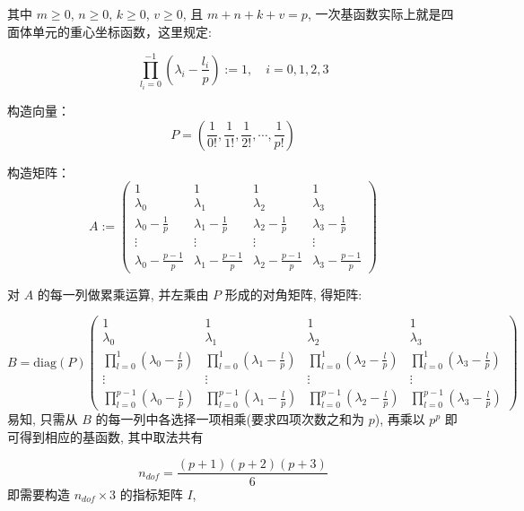 \documentclass[12pt,a4paper]{article}
\begin{document}
其中 $ m\geq 0$, $n\geq 0$, $ k \geq 0$, $v\geq 0$,  且 $m+n+k+v=p$, 一次基函数实际上就是四面体单元的重心坐标函数，这里规定:

$$
 \prod_{l_i=0}^{-1}(\lambda_i - \frac{l_i}{p}) := 1,\quad i=0, 1, 2, 3
$$

构造向量：
$$
P = ( \frac{1}{0!},  \frac{1}{1!}, \frac{1}{2!}, \cdots, \frac{1}{p!})
$$

构造矩阵：
$$
A :=                                                                            
\begin{pmatrix}  
1  &  1  & 1 & 1\\
\lambda_0 & \lambda_1 & \lambda_2 & \lambda_3\\                                             
\lambda_0 - \frac{1}{p} & \lambda_1 - \frac{1}{p} & \lambda_2 - \frac{1}{p} & \lambda_3 - \frac{1}{p}\\   
\vdots & \vdots & \vdots & \vdots \\                                                     
\lambda_0 - \frac{p - 1}{p} & \lambda_1 - \frac{p - 1}{p} & \lambda_2 - \frac{p - 1}{p}& \lambda_3 - \frac{p - 1}{p}
\end{pmatrix}                                                                   
$$ 

对 $A$ 的每一列做累乘运算, 并左乘由 $P$ 形成的对角矩阵, 得矩阵:

$$
B = \mathrm{diag}(P)
\begin{pmatrix}
1 & 1 & 1 & 1\\
\lambda_0 & \lambda_1 & \lambda_2 & \lambda_3\\
\prod_{l=0}^{1}(\lambda_0 - \frac{l}{p}) & \prod_{l=0}^{1}(\lambda_1 - \frac{l}{p})
& \prod_{l=0}^{1}(\lambda_2 - \frac{l}{p}) & \prod_{l=0}^{1}(\lambda_3 - \frac{l}{p}) \\
\vdots & \vdots & \vdots & \vdots \\
\prod_{l=0}^{p-1}(\lambda_0 - \frac{l}{p}) & \prod_{l=0}^{p-1}(\lambda_1 - \frac{l}{p})
& \prod_{l=0}^{p-1}(\lambda_2 - \frac{l}{p}) & \prod_{l=0}^{p-1}(\lambda_3 - \frac{l}{p}) 
\end{pmatrix}
$$
易知, 只需从 $B$ 的每一列中各选择一项相乘(要求四项次数之和为 $p$), 再乘以 $p^p$ 即可得到相应的基函数, 其中取法共有 

$$
n_{dof} = \frac{(p+1)(p+2)(p+3)}{6}
$$
即需要构造 $n_{dof}\times 3$ 的指标矩阵 $I$, 
\end{document}
